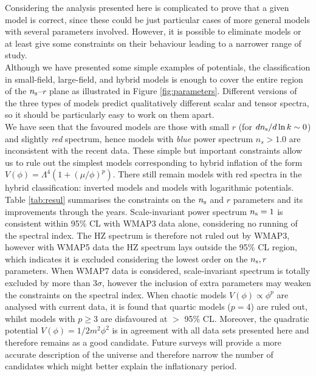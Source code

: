 \documentclass{rmaa}
\begin{document}
Considering the analysis presented here is complicated to prove 
that a given model is correct, since these could be just particular cases of more general 
models with several parameters involved. However, it is possible to eliminate models 
or at least give some constraints on their behaviour leading to a narrower range of study.
\\

Although we have presented some simple examples of potentials, 
the classification in small-field, large-field, and hybrid models is enough to 
cover the entire region of the $n_{\rm s}$--$r$ plane as illustrated in Figure \ref{fig:parameters}.  
Different versions of the three types of models predict qualitatively different
scalar and tensor spectra, so it should be particularly easy to work on
them apart.
\\

We have seen that the favoured models are those with small $r$ (for $dn_{\rm s}/d\ln{k}\sim 0$)
and slightly \textit{red} spectrum, hence models with \textit{blue} power spectrum  $n_s > 1.0$
are inconsistent with the recent data. These simple but important constraints allow us to rule out
the simplest models corresponding to hybrid inflation of the form 
$V(\phi) = \Lambda^4(1 + (\mu / \phi)^{p})$. There still remain models with red spectra in 
the hybrid classification: inverted models and models with logarithmic potentials. 
\\

Table \ref{tab:resul} summarises the constraints on the $n_{\rm s}$ and $r$ parameters
and its improvements through the years.
Scale-invariant power spectrum $n_{\rm s} = 1$ is consistent within 95\% CL with WMAP3 data 
alone, considering no running of the spectral index. The HZ spectrum 
is therefore not ruled out by WMAP3, however with WMAP5 data the HZ spectrum lays outside 
the 95\% CL region, which indicates it is excluded considering the lowest order 
on the $n_{\rm s}, r$ parameters. When WMAP7 data is considered, 
scale-invariant spectrum is totally excluded by more than $3 \sigma$, 
 however the inclusion of extra parameters may weaken the constraints on the spectral index.
When chaotic models $V(\phi)\propto\phi^p$ are analysed with current data, 
it is found that quartic models 
($p=4$) are ruled out, whilst models with $p\ge3$ are disfavoured at $>$ 95\% CL.
Moreover, the quadratic potential $V(\phi)= 1/2 m^2 \phi^2$ is in agreement
with all data sets presented here and therefore remains as a good candidate.
Future surveys will  provide a more accurate description of the universe and therefore 
narrow the number of candidates which might better explain the inflationary period.
\end{document}
